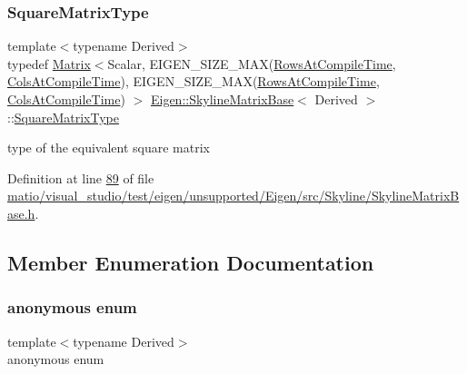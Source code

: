 \subsubsection{\texorpdfstring{Square\+Matrix\+Type}{SquareMatrixType}\hspace{0.1cm}{\footnotesize\ttfamily [2/2]}}
{\footnotesize\ttfamily template$<$typename Derived$>$ \\
typedef \hyperlink{group___core___module_class_eigen_1_1_matrix}{Matrix}$<$Scalar, E\+I\+G\+E\+N\+\_\+\+S\+I\+Z\+E\+\_\+\+M\+AX(\hyperlink{class_eigen_1_1_skyline_matrix_base_a811ba3961cb927ae5fa84ed278ebceeaa22b71b821112b0ccf61b7317b9ac4cf4}{Rows\+At\+Compile\+Time}, \hyperlink{class_eigen_1_1_skyline_matrix_base_a811ba3961cb927ae5fa84ed278ebceeaa0bb8b9ae248b86ca53aff754311111e8}{Cols\+At\+Compile\+Time}), E\+I\+G\+E\+N\+\_\+\+S\+I\+Z\+E\+\_\+\+M\+AX(\hyperlink{class_eigen_1_1_skyline_matrix_base_a811ba3961cb927ae5fa84ed278ebceeaa22b71b821112b0ccf61b7317b9ac4cf4}{Rows\+At\+Compile\+Time}, \hyperlink{class_eigen_1_1_skyline_matrix_base_a811ba3961cb927ae5fa84ed278ebceeaa0bb8b9ae248b86ca53aff754311111e8}{Cols\+At\+Compile\+Time}) $>$ \hyperlink{class_eigen_1_1_skyline_matrix_base}{Eigen\+::\+Skyline\+Matrix\+Base}$<$ Derived $>$\+::\hyperlink{class_eigen_1_1_skyline_matrix_base_a2cc6375aec33f8ed497d1729f8888899}{Square\+Matrix\+Type}}

type of the equivalent square matrix 

Definition at line \hyperlink{matio_2visual__studio_2test_2eigen_2unsupported_2_eigen_2src_2_skyline_2_skyline_matrix_base_8h_source_l00089}{89} of file \hyperlink{matio_2visual__studio_2test_2eigen_2unsupported_2_eigen_2src_2_skyline_2_skyline_matrix_base_8h_source}{matio/visual\+\_\+studio/test/eigen/unsupported/\+Eigen/src/\+Skyline/\+Skyline\+Matrix\+Base.\+h}.



\subsection{Member Enumeration Documentation}
\mbox{\label{class_eigen_1_1_skyline_matrix_base_a811ba3961cb927ae5fa84ed278ebceea}} 
\subsubsection{\texorpdfstring{anonymous enum}{anonymous enum}}
{\footnotesize\ttfamily template$<$typename Derived$>$ \\
anonymous enum}

